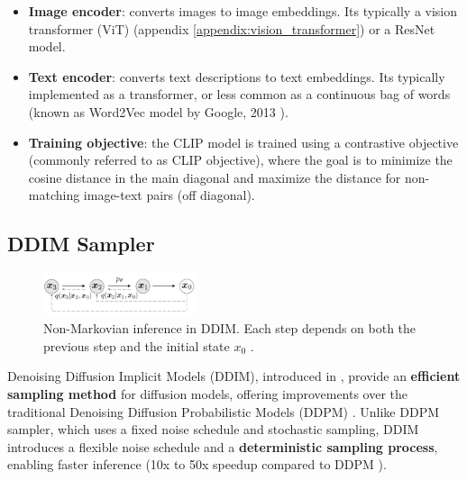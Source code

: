 \begin{itemize}
    \item \textbf{Image encoder}: converts images to image embeddings. Its typically a vision transformer (ViT) \cite{vision_transformer} (appendix \ref{appendix:vision_transformer}) or a ResNet \cite{resnet} model.
    \item \textbf{Text encoder}: converts text descriptions to text embeddings. Its typically implemented as a transformer, or less common as a continuous bag of words \cite{cbow_word2vec} (known as Word2Vec model by Google, 2013 \cite{cbow_word2vec}).
    \item \textbf{Training objective}: the CLIP model is trained using a contrastive objective (commonly referred to as CLIP objective), where the goal is to minimize the cosine distance in the main diagonal and maximize the distance for non-matching image-text pairs (off diagonal).
\end{itemize}





















\subsection{DDIM Sampler}
\label{subsec:ddim_sampler}

\begin{figure}[ht]
    \centering
    \includegraphics[width=0.4\textwidth]{images/diffusion_models/stable_diffusion/ddim_non_markov_process.png}
    \caption{Non-Markovian inference in DDIM. Each step depends on both the previous step and the initial state $x_0$ \cite{ddim}.}
    \label{fig:ddim_non_markov_process}
\end{figure}

Denoising Diffusion Implicit Models (DDIM), introduced in \cite{ddim}, provide an \textbf{efficient sampling method} for diffusion models, offering improvements over the traditional Denoising Diffusion Probabilistic Models (DDPM) \cite{ddpm}. Unlike DDPM sampler, which uses a fixed noise schedule and stochastic sampling, DDIM introduces a flexible noise schedule and a \textbf{deterministic sampling process}, enabling faster inference (10x to 50x speedup compared to DDPM \cite{ddim}).

